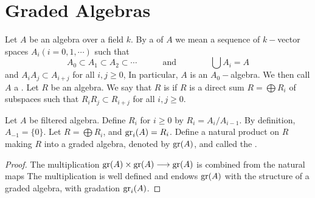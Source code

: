 \newpage\section{Graded Algebras}

  \begin{defn}
    Let $A$ be an algebra over a field $k$. By a  of $A$ we mean a sequence of $k-$vector spaces $A_i (i=0,1,\cdots)$ such that
    \begin{equation*}
      A_0\subset A_1\subset A_2\subset \cdots \qquad\quad \text{and} \qquad\qquad \bigcup A_i=A
    \end{equation*}
    and $A_iA_j\subset A_{i+j}$ for all $i,j\geqslant 0$, In particular, $A$ is an $A_0-$algebra. We then call $A$ a . Let $R$ be an algebra. We say that $R$ is  if $R$ is a direct sum $R=\bigoplus R_i$ of subspaces such that $R_iR_j\subset R_{i+j}$ for all $i,j\geqslant0$.
  \end{defn}

  \begin{ex}
    Let $A$ be filtered algebra. Define $R_i$ for $i\geqslant0$ by $R_i=A_i/A_{i-1}$. By definition, $A_{-1}=\{0\}$. Let $R=\bigoplus R_i$, and $\operatorname{gr}_i(A)=R_i$. Define a natural product on $R$ making $R$ into a graded algebra, denoted by $\operatorname{gr}(A)$, and called the .
  \end{ex}
  \begin{proof}
    The multiplication $\operatorname{gr}(A)\times\operatorname{gr}(A)\longrightarrow\operatorname{gr}(A)$ is combined from the natural maps
    The multiplication is well defined and endows $\operatorname{gr}(A)$ with the structure of a graded algebra, with gradation $\operatorname{gr}_i(A)$.
  \end{proof}

